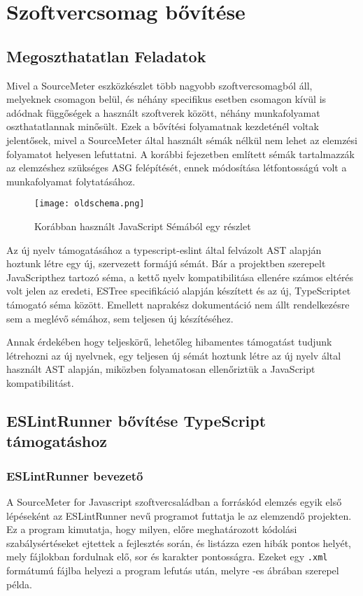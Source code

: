 \chapter{Szoftvercsomag bővítése}
\label{chap:fejezet4}

\section{Megoszthatatlan Feladatok}

Mivel a SourceMeter eszközkészlet több nagyobb szoftvercsomagból áll, melyeknek csomagon belül, és néhány specifikus esetben csomagon kívül is adódnak függőségek a használt szoftverek között, néhány munkafolyamat oszthatatlannak minősült. Ezek a bővítési folyamatnak kezdeténél voltak jelentősek, mivel a SourceMeter által használt sémák nélkül nem lehet az elemzési folyamatot helyesen lefuttatni. A korábbi fejezetben említett sémák tartalmazzák az elemzéshez szükséges ASG felépítését, ennek módosítása létfontosságú volt a munkafolyamat folytatásához.

\begin{figure}[!htbp]
    \caption{Korábban használt JavaScript Sémából egy részlet}\label{fig:apocalypse}
    \centering
    \texttt{[image: oldschema.png]}
\end{figure}

Az új nyelv támogatásához a typescript-eslint által felvázolt AST \cite{typescript-eslint-ast} alapján hoztunk létre egy új, szervezett formájú sémát. Bár a projektben szerepelt JavaScripthez tartozó séma, a kettő nyelv kompatibilitása ellenére számos eltérés volt jelen az eredeti, ESTree specifikáció \cite{estree-spec} alapján készített és az új, TypeScriptet támogató séma között. Emellett naprakész dokumentáció nem állt rendelkezésre sem a meglévő sémához, sem teljesen új készítéséhez.

Annak érdekében hogy teljeskörű, lehetőleg hibamentes támogatást tudjunk létrehozni az új nyelvnek, egy teljesen új sémát hoztunk létre az új nyelv által használt AST alapján, miközben folyamatosan ellenőriztük a JavaScript kompatibilitást. 

\section{ESLintRunner bővítése TypeScript támogatáshoz}

\subsection{ESLintRunner bevezető}
A SourceMeter for Javascript szoftvercsaládban a forráskód elemzés egyik első lépéseként az ESLintRunner nevű programot futtatja le az elemzendő projekten. Ez a program kimutatja, hogy milyen, előre meghatározott kódolási szabálysértéseket ejtettek a fejlesztés során, és listázza ezen hibák pontos helyét, mely fájlokban fordulnak elő, sor és karakter pontosságra. Ezeket egy \texttt{.xml} formátumú fájlba helyezi a program lefutás után, melyre -es ábrában szerepel példa.

